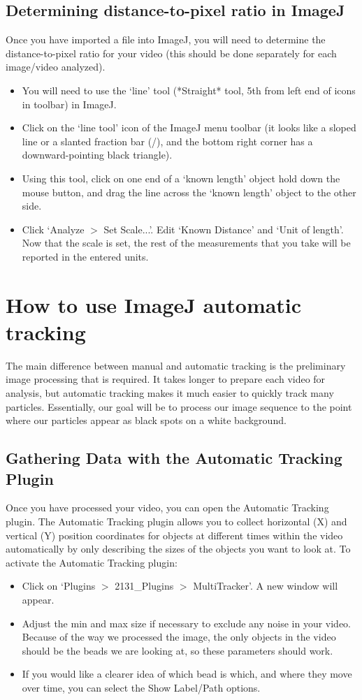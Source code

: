 \subsection*{Determining distance-to-pixel ratio in ImageJ}
Once you have imported a file into ImageJ, you will need to determine the distance-to-pixel ratio for your video (this should be done separately for each image/video analyzed). 
\begin{itemize}
\item You will need to use the `line' tool (*Straight* tool, 5th from left end of icons in toolbar) in ImageJ.
\item Click on the `line tool' icon of the ImageJ menu toolbar (it looks like a sloped line or a slanted fraction bar (/), and the bottom right corner has a downward-pointing black triangle). 
\item Using this tool, click on one end of a `known length’ object hold down the mouse button, and drag the line across the `known length’ object to the other side. 
\item Click `Analyze $>$ Set Scale...'. Edit `Known Distance' and `Unit of length'. Now that the scale is set, the rest of the measurements that you take will be reported in the entered units.
\end{itemize}

\section{How to use ImageJ automatic tracking}
The main difference between manual and automatic tracking is the preliminary image processing that is required. 
It takes longer to prepare each video for analysis, but automatic tracking makes it much easier to quickly track many particles. 
Essentially, our goal will be to process our image sequence to the point where our particles appear as black spots on a white background.

\subsection*{Gathering Data with the Automatic Tracking Plugin}
Once you have processed your video, you can open the Automatic Tracking plugin. 
The Automatic Tracking plugin allows you to collect horizontal (X) and vertical (Y) position coordinates for objects at different times within the video automatically by only describing the sizes of the objects you want to look at. 
To activate the Automatic Tracking plugin:
\begin{itemize}
\item Click on `Plugins $>$ 2131\_Plugins $>$ MultiTracker'. A new window will appear. 
\item Adjust the min and max size if necessary to exclude any noise in your video. 
Because of the way we processed the image, the only objects in the video should be the beads we are looking at, so these parameters should work.
\item If you would like a clearer idea of which bead is which, and where they move over time, you can select the Show Label/Path options.
\end{itemize}

